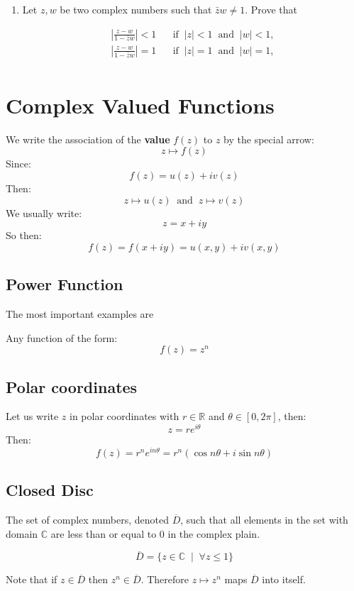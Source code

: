 \begin{enumerate}
	\item Let $z, w$ be two complex numbers such that $\bar{z}w \neq 1.$ Prove that
	
	\begin{align*}
		\left| \frac{z - w}{1 - \bar{z}w} \right| < 1 \;\;\;\;\;\; \text{if} \;\; |z| < 1 \;\; \text{and} \;\; |w| < 1, \\
		\left| \frac{z - w}{1 - \bar{z}w} \right| = 1 \;\;\;\;\;\; \text{if} \;\; |z| = 1 \;\; \text{and} \;\; |w| = 1, \\
	\end{align*}


\end{enumerate}

\section{Complex Valued Functions}
We write the association of the \textbf{value} $f(z)$ to $z$ by the special arrow:
\[z \mapsto f(z) \]
Since:
\[f(z) = u(z) +iv(z)\]
Then:
\[z \mapsto u(z) \;\; \text{and} \;\;  z \mapsto v(z) \]
We usually write:
\[z = x + iy\]
So then:
\[f(z) = f(x + iy) = u(x,y) + iv(x,y)\]

\subsection{Power Function}
The most important examples are 
\begin{defn}
Any function of the form:
	\[f(z) = z^n\]
\end{defn}
\subsection{Polar coordinates}
Let us write $z$ in polar coordinates with $r \in \mathbb{R}$ and $\theta \in [0, 2\pi]$, then:
\[ z = re^{i\theta}\]
Then:
\[f(z) = r^ne^{in\theta} = r^n(\cos{n\theta} + i\sin{n\theta})\]

\subsection{Closed Disc}
The set of complex numbers, denoted $\overline{D}$, such that all elements in the set with domain $\mathbb{C}$ are less than or equal to $0$ in the complex plain.
\begin{defn}
	\[\overline{D} = \{z \in \mathbb{C} \;\;|\;\; \forall z \leq 1 \} \]
\end{defn}
Note that if $z \in \overline{D}$ then $z^n \in \overline{D}$. Therefore $z \mapsto z^n$ maps $\overline{D}$ into itself. \\

